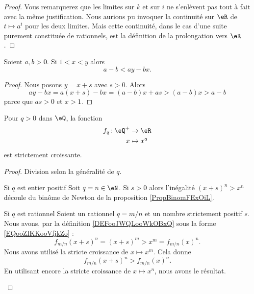 \begin{proof}
    Vous remarquerez que les limites sur \( k\) et sur \( i\) ne s'enlèvent pas tout à fait avec la même justification. Nous aurions pu invoquer la continuité sur \( \eR\) de \( t\mapsto a^t\) pour les deux limites. Mais cette continuité, dans le cas d'une suite purement constituée de rationnels, est la définition de la prolongation vers \( \eR\).
\end{proof}

\begin{lemma}       \label{LEMooIPLLooCgpCIn}
    Soient \( a,b>0\). Si \( 1<x<y\) alors
    \begin{equation}
        a-b<ay-bx.
    \end{equation}
\end{lemma}

\begin{proof}
    Nous posons \( y=x+s\) avec \( s>0\). Alors
    \begin{equation}
        ay-bx=a(x+s)-bx=(a-b)x+as>(a-b)x>a-b
    \end{equation}
    parce que \( as>0\) et \( x>1\).
\end{proof}

\begin{proposition}      \label{PROPooJXHFooCDwxCS}
    Pour \( q>0\) dans \( \eQ\), la fonction
    \begin{equation}
        \begin{aligned}
            f_{q}\colon \eQ^+&\to \eR \\
                x&\mapsto x^{q} 
        \end{aligned}
    \end{equation}
    est strictement croissante.
\end{proposition}

\begin{proof}
    Division selon la généralité de \(q\).
    \begin{subproof}
        \item[Si \( q\) est entier positif]
            Soit \( q=n\in \eN\). Si \( s>0\) alors l'inégalité \( (x+s)^n>x^n\) découle du binôme de Newton de la proposition \ref{PropBinomFExOiL}.
        \item[Si \( q\) est rationnel]
            Soient un rationnel \( q=m/n\) et un nombre strictement positif \( s\). Nous avons, par la définition \ref{DEFooJWQLooWkOBxQ} sous la forme \eqref{EQooZIKKooVfjkZo} :
            \begin{equation}
                f_{m/n}(x+s)^n=(x+s)^m>x^m=f_{m/n}(x)^n.
            \end{equation}
            Nous avons utilisé la stricte croissance de \( x\mapsto x^m\). Cela donne
            \begin{equation}
                f_{m/n}(x+s)^n>f_{m/n}(x)^n.
            \end{equation}
            En utilisant encore la stricte croissance de \( x\mapsto x^n\), nous avons le résultat.
    \end{subproof}
\end{proof}

